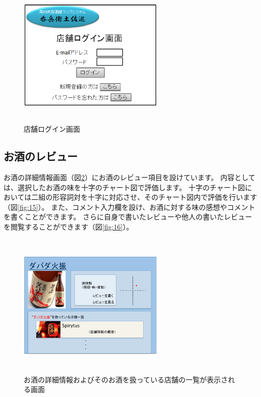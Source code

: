 \documentclass[a4j,titlepage]{jarticle}
\begin{document}
\begin{figure}[htbp]
  \begin{center}
  \includegraphics [height=7cm, width=7cm]{extrnal1_design_document_image/s5.eps}
  \caption{店舗ログイン画面}
  \label {fig:s5}
  \end{center}
\end{figure}

\newpage
\subsection{お酒のレビュー}
お酒の詳細情報画面（図\ref{fig:14}）にお酒のレビュー項目を設けています。
内容としては、選択したお酒の味を十字のチャート図で評価します。
十字のチャート図においては二組の形容詞対を十字に対応させ、そのチャート図内で評価を行います（図\ref{fig:15}）。
また、コメント入力欄を設け、お酒に対する味の感想やコメントを書くことができます。
さらに自身で書いたレビューや他人の書いたレビューを閲覧することができます（図\ref{fig:16}）。

\begin {figure}[htbp]
    \begin{center}
    \includegraphics [height=7cm, width=7cm]{extrnal_design_document_image/14.eps}
    \caption {お酒の詳細情報およびそのお酒を扱っている店舗の一覧が表示される画面}
    \label {fig:14}
    \end{center}
\end {figure}
\end{document}
